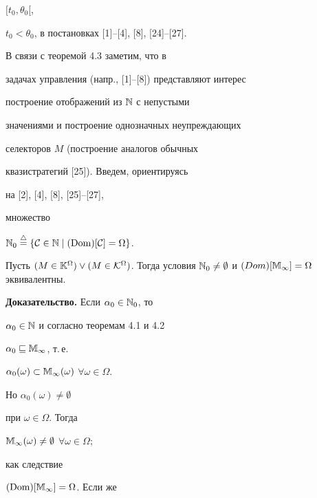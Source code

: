 $[{t_0}, {{\theta}_0}[$,


${t_0} < {{\theta}_0}$, в постановках [1]--[4], [8], [24]--[27].





В связи с теоремой 4.3 заметим, что в


задачах управления (напр., [1]--[8]) представляют интерес


построение отображений из ${\Bbb N}$ с непустыми


значениями и построение однозначных неупреждающих


селекторов $M$ (построение аналогов обычных


квазистратегий [25]). Введем, ориентируясь


на [2], [4], [8], [25]--[27],


множество


${{\Bbb N}_0}\stac\{{\cal C} \in {\Bbb N} \mid


(\Dom)[{\cal C}] = \Omega\}$.





\begin{thms}


Пусть $(M \in {{\Bbb K}^\Omega}) \vee


(M \in {{\cal K}^\Omega})$. Тогда условия ${{\Bbb N}_0} \ne


\emptyset$ и $(Dom)[{\Bbb M}_\infty] = \Omega$ эквивалентны.


\end{thms}





{\bf Доказательство.} Если ${{\alpha}_0} \in {{\Bbb N}_0}$, то


${{\alpha}_0} \in {\Bbb N}$ и согласно теоремам 4.1 и 4.2


${{\alpha}_0} \sqsubseteq {{\Bbb M}_\infty}$, т.\,е.


${{{\alpha}_0}(\omega)} \subset


{{{\Bbb M}_\infty}(\omega)}$ $\forall{\omega} \in \Omega$.


Но ${{{\alpha}_0}(\omega)} \ne \emptyset$


при $\omega \in \Omega$. Тогда 


${{{\Bbb M}_\infty}(\omega)} \ne \emptyset$ $\forall{\omega} \in \Omega$;


как следствие


${(\operatorname{Dom})[{\Bbb M}_\infty]} = \Omega$. Если же


